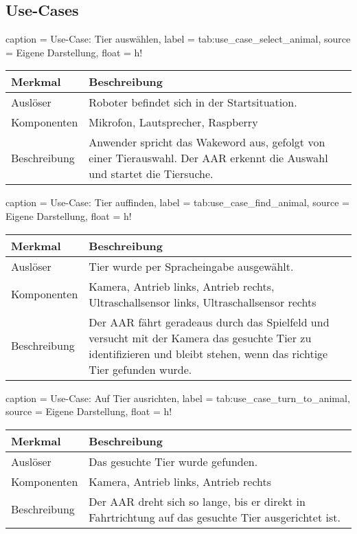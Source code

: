 \subsection{Use-Cases}

\begin{dhbwtable}{%
    caption	= Use-Case: Tier auswählen,
    label	= tab:use_case_select_animal,
    source	= Eigene Darstellung,
    float = h!
}
    \begin{tabularx}{\textwidth}{lX}
        \toprule
        \textbf{Merkmal}     & \textbf{Beschreibung}  \\\midrule
        Auslöser     & Roboter befindet sich in der Startsituation.\\
        Komponenten  & Mikrofon, Lautsprecher, Raspberry\\
        Beschreibung & Anwender spricht das Wakeword aus, gefolgt von einer Tierauswahl. Der \ac{AAR} erkennt die Auswahl und startet die Tiersuche.\\\bottomrule
    \end{tabularx}    
\end{dhbwtable}

\begin{dhbwtable}{%
    caption	= Use-Case: Tier auffinden,
    label	= tab:use_case_find_animal,
    source	= Eigene Darstellung,
    float = h!
}
    \begin{tabularx}{\textwidth}{lX}
        \toprule
        \textbf{Merkmal}     & \textbf{Beschreibung}  \\\midrule
        Auslöser     & Tier wurde per Spracheingabe ausgewählt.\\
        Komponenten  & Kamera, Antrieb links, Antrieb rechts, Ultraschallsensor links, Ultraschallsensor rechts\\
        Beschreibung & Der \ac{AAR} fährt geradeaus durch das Spielfeld und versucht mit der Kamera das gesuchte Tier zu identifizieren und bleibt stehen, wenn das richtige Tier gefunden wurde.\\\bottomrule
    \end{tabularx}    
\end{dhbwtable}

\begin{dhbwtable}{%
    caption	= Use-Case: Auf Tier ausrichten,
    label	= tab:use_case_turn_to_animal,
    source	= Eigene Darstellung,
    float = h!
}
    \begin{tabularx}{\textwidth}{lX}
        \toprule
        \textbf{Merkmal}     & \textbf{Beschreibung}  \\\midrule
        Auslöser     & Das gesuchte Tier wurde gefunden.\\
        Komponenten  & Kamera, Antrieb links, Antrieb rechts\\
        Beschreibung & Der \ac{AAR} dreht sich so lange, bis er direkt in Fahrtrichtung auf das gesuchte Tier ausgerichtet ist.\\\bottomrule
    \end{tabularx}    
\end{dhbwtable}

